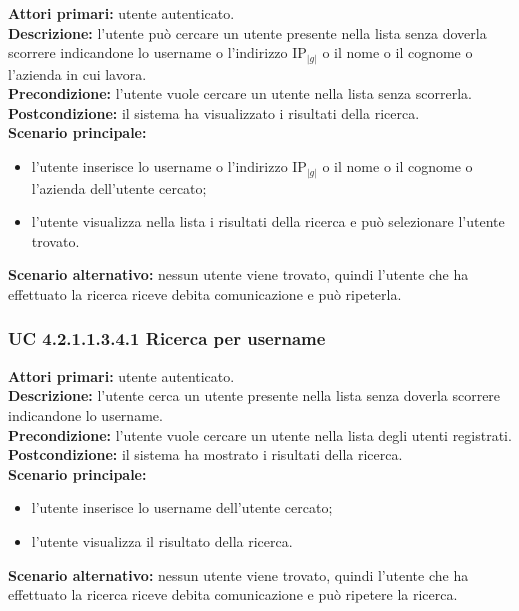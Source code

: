 \noindent
\textbf{Attori primari:} utente autenticato.\\
\textbf{Descrizione:} l'utente può cercare un utente presente nella lista senza doverla scorrere indicandone lo username o l'indirizzo IP$_{|g|}$ o il nome o il cognome o l'azienda in cui lavora.\\
\textbf{Precondizione:} l'utente vuole cercare un utente nella lista senza scorrerla.\\
\textbf{Postcondizione:} il sistema ha visualizzato i risultati della ricerca.\\
\textbf{Scenario principale:}
\begin{itemize}
\item l'utente inserisce lo username o l'indirizzo IP$_{|g|}$ o il nome o il cognome o l'azienda dell'utente cercato;
\item l'utente visualizza nella lista i risultati della ricerca e può selezionare l'utente trovato.
\end{itemize}
\textbf{Scenario alternativo:} nessun utente viene trovato, quindi l'utente che ha effettuato la ricerca riceve debita comunicazione e può ripeterla.

\subsubsection{UC 4.2.1.1.3.4.1 Ricerca per username}
\noindent
\textbf{Attori primari:} utente autenticato.\\
\textbf{Descrizione:} l'utente cerca un utente presente nella lista senza doverla scorrere indicandone lo username.\\
\textbf{Precondizione:} l'utente vuole cercare un utente nella lista degli utenti registrati.\\
\textbf{Postcondizione:} il sistema ha mostrato i risultati della ricerca.\\
\textbf{Scenario principale:}
\begin{itemize}
\item l'utente inserisce lo username dell'utente cercato;
\item l'utente visualizza il risultato della ricerca.
\end{itemize}
\textbf{Scenario alternativo:} nessun utente viene trovato, quindi l'utente che ha effettuato la ricerca riceve debita comunicazione e può ripetere la ricerca.

